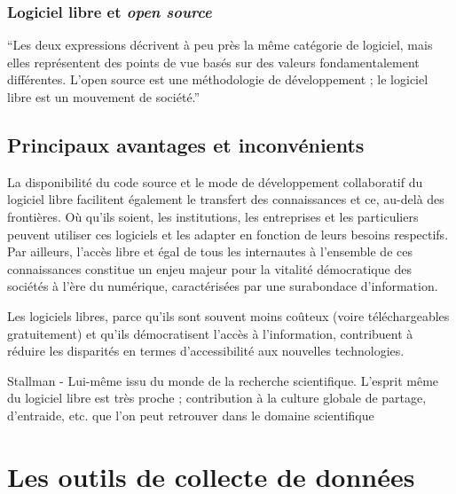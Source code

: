 \documentclass[
  letterpaper,
]{scrbook}
\begin{document}
\hypertarget{logiciel-libre-et-open-source}{%
\subsection{\texorpdfstring{Logiciel libre et \emph{open
source}}{Logiciel libre et open source}}\label{logiciel-libre-et-open-source}}

``Les deux expressions décrivent à peu près la même catégorie de
logiciel, mais elles représentent des points de vue basés sur des
valeurs fondamentalement différentes. L'open source est une méthodologie
de développement ; le logiciel libre est un mouvement de société.''

\hypertarget{principaux-avantages-et-inconvuxe9nients}{%
\section{Principaux avantages et
inconvénients}\label{principaux-avantages-et-inconvuxe9nients}}

La disponibilité du code source et le mode de développement collaboratif
du logiciel libre facilitent également le transfert des connaissances et
ce, au-delà des frontières. Où qu'ils soient, les institutions, les
entreprises et les particuliers peuvent utiliser ces logiciels et les
adapter en fonction de leurs besoins respectifs. Par ailleurs, l'accès
libre et égal de tous les internautes à l'ensemble de ces connaissances
constitue un enjeu majeur pour la vitalité démocratique des sociétés à
l'ère du numérique, caractérisées par une surabondace d'information.

Les logiciels libres, parce qu'ils sont souvent moins coûteux (voire
téléchargeables gratuitement) et qu'ils démocratisent l'accès à
l'information, contribuent à réduire les disparités en termes
d'accessibilité aux nouvelles technologies.

Stallman - Lui-même issu du monde de la recherche scientifique. L'esprit
même du logiciel libre est très proche ; contribution à la culture
globale de partage, d'entraide, etc. que l'on peut retrouver dans le
domaine scientifique


\hypertarget{les-outils-de-collecte-de-donnuxe9es}{%
\chapter{Les outils de collecte de
données}\label{les-outils-de-collecte-de-donnuxe9es}}
\end{document}
